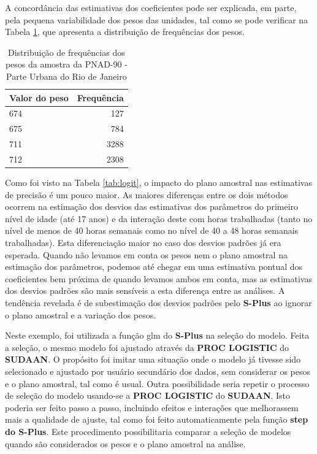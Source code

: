 \documentclass[]{book}
\theoremstyle{definition}
\theoremstyle{definition}
\theoremstyle{definition}
\theoremstyle{remark}
\begin{document}
A concordância das estimativas dos coeficientes pode ser explicada, em
parte, pela pequena variabilidade dos pesos das unidades, tal como se
pode verificar na Tabela \ref{tab:pesofreq}, que apresenta a
distribuição de frequências dos pesos.

\begin{table}

\caption{\label{tab:pesofreq}Distribuição de frequências dos pesos da amostra da PNAD-90 - Parte
Urbana do Rio de Janeiro}
\centering
\begin{tabular}[t]{lr}
\toprule
Valor do peso & Frequência\\
\midrule
674 & 127\\
675 & 784\\
711 & 3288\\
712 & 2308\\
\bottomrule
\end{tabular}
\end{table}

Como foi visto na Tabela \ref{tab:logit}, o impacto do plano amostral
nas estimativas de precisão é um pouco maior. As maiores diferenças
entre os dois métodos ocorrem na estimação dos desvios das estimativas
dos parâmetros do primeiro nível de idade (até 17 anos) e da interação
deste com horas trabalhadas (tanto no nível de menos de 40 horas
semanais como no nível de 40 a 48 horas semanais trabalhadas). Esta
diferenciação maior no caso dos desvios padrões já era esperada. Quando
não levamos em conta os pesos nem o plano amostral na estimação dos
parâmetros, podemos até chegar em uma estimativa pontual dos
coeficientes bem próxima de quando levamos ambos em conta, mas as
estimativas dos desvios padrões são mais sensíveis a esta diferença
entre as análises. A tendência revelada é de subestimação dos desvios
padrões pelo \textbf{S-Plus} ao ignorar o plano amostral e a variação
dos pesos.

Neste exemplo, foi utilizada a função glm do \textbf{S-Plus} na seleção
do modelo. Feita a seleção, o mesmo modelo foi ajustado através da
\textbf{PROC LOGISTIC} do \textbf{SUDAAN}. O propósito foi imitar uma
situação onde o modelo já tivesse sido selecionado e ajustado por
usuário secundário dos dados, sem considerar os pesos e o plano
amostral, tal como é usual. Outra possibilidade seria repetir o processo
de seleção do modelo usando-se a \textbf{PROC LOGISTIC} do
\textbf{SUDAAN}. Isto poderia ser feito passo a passo, incluindo efeitos
e interações que melhorassem mais a qualidade de ajuste, tal como foi
feito automaticamente pela função \textbf{step do S-Plus}. Este
procedimento possibilitaria comparar a seleção de modelos quando são
considerados os pesos e o plano amostral na análise.
\end{document}
